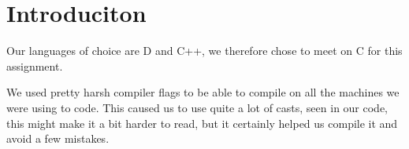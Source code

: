 \section{Introduciton}
Our languages of choice are D and C++, we therefore chose to meet on C for this assignment. 

We used pretty harsh compiler flags to be able to compile on all the machines we were using to code. This caused us to use quite a lot of casts, seen in our code, this might make it a bit harder to read, but it certainly helped us compile it and avoid a few mistakes. 
